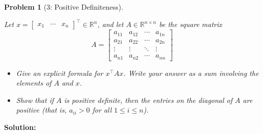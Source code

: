 \documentclass[11pt]{exam}
\theoremstyle{quest}
\newtheorem*{question}{Problem}
\begin{document}
\bigskip

\begin{question}[3: Positive Definiteness]
~

Let $x = \begin{bmatrix}x_1 & \cdots & x_n\end{bmatrix}^\top \in \mathbb{R}^n$,
and let $A \in \mathbb{R}^{n \times n}$ be the square matrix
\begin{equation*}
A = \begin{bmatrix}
  a_{11} & a_{12} & \cdots & a_{1n} \\
  a_{21} & a_{22} & \cdots & a_{2n} \\
  \vdots  & \vdots  & \ddots & \vdots  \\
  a_{n1} & a_{n2} & \cdots & a_{nn}
\end{bmatrix}
\end{equation*}

\begin{itemize}
\item[(a)] Give an explicit formula for $x^\top A x$. Write your answer as a sum
  involving the elements of $A$ and $x$.
\item[(b)] Show that if $A$ is positive definite, then the entries on the
  diagonal of $A$ are positive (that is, $a_{ii} > 0$ for all
  $1 \leq i \leq n$).
\end{itemize}
\end{question}
\textbf{Solution:}




\newpage

\end{document}
